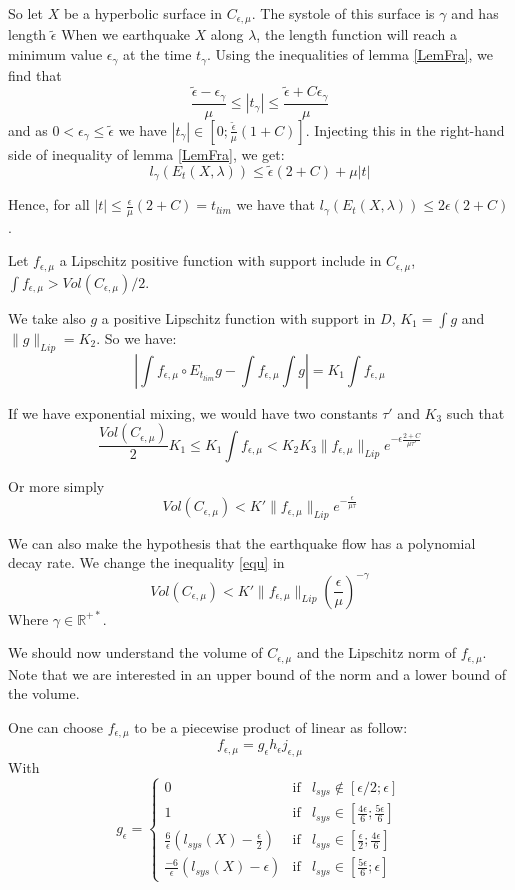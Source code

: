 So let $X$ be a hyperbolic surface in $C_{\epsilon,\mu}$. The systole of this surface is $\gamma$ and has length $\tilde{\epsilon}$
When we earthquake $X$ along $\lambda$, the length function will reach a minimum value $\epsilon_\gamma$ at the time $t_\gamma$. Using the inequalities of lemma \ref{LemFra}, we find that \[
\frac{\tilde{\epsilon}-\epsilon_\gamma}{\mu} \leq |t_\gamma | \leq \frac{\tilde{\epsilon} + C \epsilon_\gamma}{\mu}
\]
and as $0 < \epsilon_\gamma \leq \tilde{\epsilon}$ we have $|t_\gamma| \in [0; \frac{\tilde{\epsilon}}{\mu}(1+C)]$. Injecting this in the right-hand side of inequality of lemma \ref{LemFra}, we get: \[
l_\gamma (E_t (X,\lambda)) \leq \tilde{\epsilon} (2+C) +\mu |t|
\]

Hence, for all $|t| \leq \frac{\epsilon}{\mu}(2+C) = t_{lim}$ we have that $l_\gamma(E_t(X,\lambda)) \leq 2 \epsilon (2+C)$.

Let $f_{\epsilon,\mu}$ a Lipschitz positive function with support include in $C_{\epsilon,\mu}$, $\int f_{\epsilon,\mu} > Vol(C_{\epsilon,\mu})/2$.

We take also $g$ a positive Lipschitz function with support in $D$, $K_1= \int g$ and $\| g \|_{Lip}= K_2$.
So we have:\[
|\int f_{\epsilon,\mu} \circ E_{t_{lim}} g - \int f_{\epsilon,\mu} \int g |=K_1 \int f_{\epsilon,\mu}
\]

If we have exponential mixing, we would have two constants $\tau'$ and $K_3$ such that \[
\frac{Vol(C_{\epsilon,\mu})}{2}K_1 \leq K_1 \int f_{\epsilon,\mu}
< K_2 K_3 \| f_{\epsilon,\mu} \|_{Lip} e^{-\epsilon \frac{2+C}{\mu \tau'}}
\]

Or more simply \begin{equation}
Vol(C_{\epsilon,\mu}) < K' \| f_{\epsilon,\mu} \|_{Lip} e^{-\frac{\epsilon}{\mu \tau}}
\label{equ}
\end{equation}


We can also make the hypothesis that the earthquake flow has a polynomial decay rate. We change the inequality \ref{equ} in
\begin{equation}
Vol(C_{\epsilon,\mu}) < K' \| f_{\epsilon,\mu} \|_{Lip} (\frac{\epsilon}{\mu})^{-\gamma}
\label{poly}
\end{equation}
Where $\gamma \in \mathbb{R^{+*}}$.

We should now understand the volume of $C_{\epsilon,\mu}$ and the Lipschitz norm of $f_{\epsilon,\mu}$. Note that we are interested in an upper bound of the norm and a lower bound of the volume.


One can choose $f_{\epsilon,\mu}$ to be a piecewise product of linear as follow:\[
f_{\epsilon,\mu}=g_{\epsilon}h_{\epsilon}j_{\epsilon,\mu}
\]
With
$$
g_{\epsilon} = \left \{
\begin{array}{lll}
0 & \text{if} & l_{sys} \notin [\epsilon/2;\epsilon]\\
1 & \text{if} & l_{sys} \in [\frac{4 \epsilon}{6};\frac{5 \epsilon}{6}]\\
\frac{6}{\epsilon}(l_{sys}(X)-\frac{\epsilon}{2}) & \text{if} & l_{sys} \in [\frac{\epsilon}{2};\frac{4 \epsilon}{6}]\\
\frac{-6}{\epsilon}(l_{sys}(X)-\epsilon) & \text{if} & l_{sys} \in [\frac{5 \epsilon}{6};\epsilon]
\end{array}
\right .
$$


